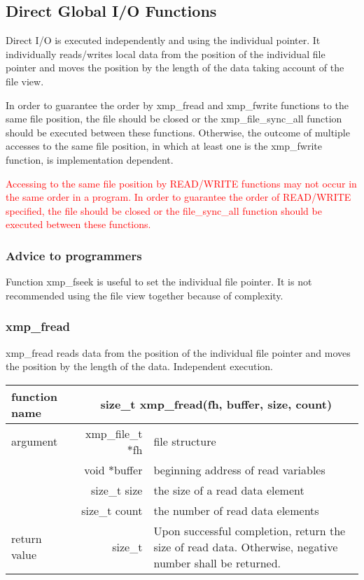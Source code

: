    \subsection{Direct Global I/O Functions}

   Direct I/O is executed independently and using the individual pointer. 
   It individually reads/writes local data
   from the position of the individual file pointer and 
   moves the position by the length of the data taking account of the file view.

   In order to guarantee the order by xmp\_fread and xmp\_fwrite functions to the same file position, the file should be closed or the xmp\_file\_sync\_all function should be executed between these functions. Otherwise, the outcome of multiple accesses to the same file position, in which at least one is the xmp\_fwrite function, is implementation dependent.
   
   \textcolor{red}{
     Accessing to the same file position by READ/WRITE functions may not
     occur in the same order in a program. In order to guarantee the
     order of READ/WRITE specified, the file should be closed or the
     file\_sync\_all function should be executed between these functions.
     }
   \fi
   
   \subsubsection*{Advice to programmers}

   Function xmp\_fseek is useful to set the individual file pointer.
   It is not recommended using the file view together because of complexity.

   \subsubsection{xmp\_fread}
   xmp\_fread reads data from the position of the individual file
   pointer and moves the position by the length of the data.
   Independent execution.

   \begin{table}[h]
    \begin{center}
     \begin{tabular}{|l|r|p{80mm}|}
      \hline
      {\bf function name}  & \multicolumn{2}{c|}{\bf size\_t
      xmp\_fread(fh, buffer, size, count)} \\ \hline \hline
      argument & xmp\_file\_t $*$fh & file structure \\ \cline{2-3}
      & void $*$buffer & beginning address of read variables \\ \cline{2-3}
      & size\_t size & the size of a read data element \\ \cline{2-3}
      & size\_t count & the number of read data elements \\ \hline
      return value & size\_t & Upon successful completion, return the size
	      of read data. Otherwise, negative number shall be
	      returned. \\ \hline
      \end{tabular}
     \end{center}
    \label{tb:aaa}
   \end{table}

